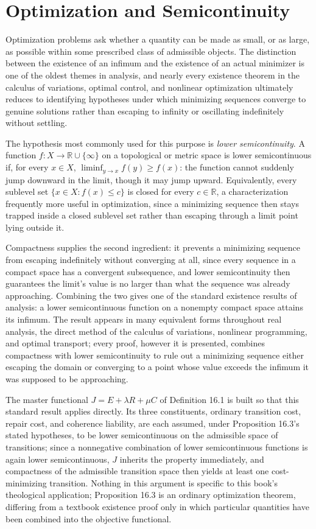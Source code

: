 \documentclass[11pt]{book}
\begin{document}
\section*{Optimization and Semicontinuity}

Optimization problems ask whether a quantity can be made as small, or as large, as possible within some prescribed class of admissible objects. The distinction between the existence of an infimum and the existence of an actual minimizer is one of the oldest themes in analysis, and nearly every existence theorem in the calculus of variations, optimal control, and nonlinear optimization ultimately reduces to identifying hypotheses under which minimizing sequences converge to genuine solutions rather than escaping to infinity or oscillating indefinitely without settling.

The hypothesis most commonly used for this purpose is \emph{lower semicontinuity}. A function $f : X \to \mathbb R \cup \{\infty\}$ on a topological or metric space is lower semicontinuous if, for every $x \in X$, $\liminf_{y \to x} f(y) \geq f(x)$: the function cannot suddenly jump downward in the limit, though it may jump upward. Equivalently, every sublevel set $\{x \in X : f(x) \leq c\}$ is closed for every $c \in \mathbb R$, a characterization frequently more useful in optimization, since a minimizing sequence then stays trapped inside a closed sublevel set rather than escaping through a limit point lying outside it.

Compactness supplies the second ingredient: it prevents a minimizing sequence from escaping indefinitely without converging at all, since every sequence in a compact space has a convergent subsequence, and lower semicontinuity then guarantees the limit's value is no larger than what the sequence was already approaching. Combining the two gives one of the standard existence results of analysis: a lower semicontinuous function on a nonempty compact space attains its infimum. The result appears in many equivalent forms throughout real analysis, the direct method of the calculus of variations, nonlinear programming, and optimal transport; every proof, however it is presented, combines compactness with lower semicontinuity to rule out a minimizing sequence either escaping the domain or converging to a point whose value exceeds the infimum it was supposed to be approaching.

The master functional $J = E + \lambda R + \mu C$ of Definition 16.1 is built so that this standard result applies directly. Its three constituents, ordinary transition cost, repair cost, and coherence liability, are each assumed, under Proposition 16.3's stated hypotheses, to be lower semicontinuous on the admissible space of transitions; since a nonnegative combination of lower semicontinuous functions is again lower semicontinuous, $J$ inherits the property immediately, and compactness of the admissible transition space then yields at least one cost-minimizing transition. Nothing in this argument is specific to this book's theological application; Proposition 16.3 is an ordinary optimization theorem, differing from a textbook existence proof only in which particular quantities have been combined into the objective functional.
\end{document}
